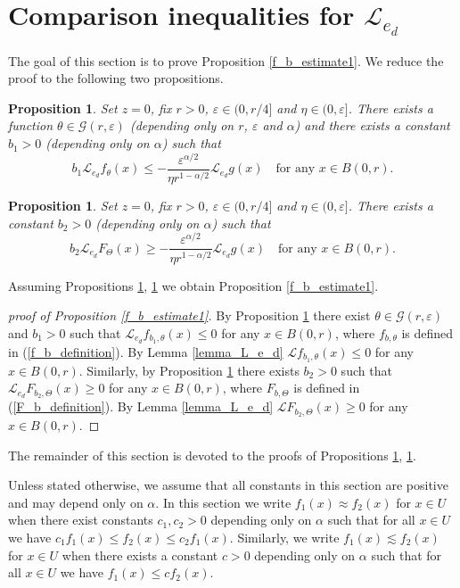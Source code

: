 \documentclass[a4paper,12pt,reqno]{amsart}
\newtheorem{proposition}[theorem]{Proposition}
\theoremstyle{definition}
\theoremstyle{remark}
\newcommand{\eps}{\varepsilon}
\newcommand{\calG}{\mathcal{G}}
\newcommand{\calL}{\mathcal{L}}
\begin{document}
\section{Comparison inequalities for $\calL_{e_d}$}

The goal of this section is to prove Proposition \ref{f_b_estimate1}.
We reduce the proof to the following two propositions. 

\begin{proposition}
\label{f_b_estimate}
Set $z = 0$, fix $r > 0$, $\eps \in (0,r/4]$ and $\eta \in (0,\eps]$. There exists a function $\theta \in \calG(r,\eps)$ (depending only on $r$, $\eps$ and $\alpha$)  and there exists a constant $b_1 > 0$ (depending only on $\alpha$) such that
$$
b_1 \calL_{e_d} f_{\theta}(x) \le - \frac{ \eps^{\alpha/2}}{\eta r^{1-\alpha/2} } \calL_{e_d} g(x)\quad \text{for any $x \in B(0,r)$.}
$$
\end{proposition}

\begin{proposition}
\label{F_b_estimate}
Set $z = 0$, fix $r > 0$, $\eps \in (0,r/4]$ and $\eta \in (0,\eps]$. There exists a constant $b_2 > 0$ (depending only on $\alpha$) such that
$$
b_2 \calL_{e_d} F_{\Theta}(x) \ge -\frac{ \eps^{\alpha/2}}{\eta r^{1-\alpha/2} } \calL_{e_d} g(x)\quad \text{for any $x \in B(0,r)$.}
$$
\end{proposition}

Assuming Propositions \ref{f_b_estimate},  \ref{F_b_estimate} we obtain Proposition \ref{f_b_estimate1}.

\begin{proof}[proof of Proposition \ref{f_b_estimate1}]
By Proposition \ref{f_b_estimate} there exist $\theta \in \calG(r,\eps)$ and $b_1 > 0$ such that $\calL_{e_d} f_{b_1,\theta}(x) \le 0$ for any $x \in B(0,r)$, where $f_{b,\theta}$ is defined in (\ref{f_b_definition}). By Lemma \ref{lemma_L_e_d} $\calL f_{b_1,\theta}(x) \le 0$ for any $x \in B(0,r)$. Similarly, by Proposition \ref{F_b_estimate} there exists $b_2 > 0$ such that $\calL_{e_d} F_{b_2,\Theta}(x) \ge 0$ for any $x \in B(0,r)$, where $F_{b,\Theta}$ is defined in (\ref{F_b_definition}). By Lemma \ref{lemma_L_e_d} 
$\calL F_{b_2,\Theta}(x) \ge 0$ for any $x \in B(0,r)$.
\end{proof}

The remainder of this section is devoted to the proofs of Propositions \ref{f_b_estimate},  \ref{F_b_estimate}. 

Unless stated otherwise, we assume that all constants in this section are positive and may depend only on $\alpha$. In this section we write $f_1(x) \approx f_2(x)$ for $x \in U$ when there exist constants $c_1, c_2 > 0$ depending only on $\alpha$ such that for all $x \in U$ we have $c_1 f_1(x) \le f_2(x) \le c_2 f_1(x)$. Similarly, we write $f_1(x) \lesssim f_2(x)$ for $x \in U$ when there exists a constant $c > 0$ depending only on $\alpha$ such that for all $x \in U$ we have $f_1(x) \le c f_2(x)$. 
\end{document}
